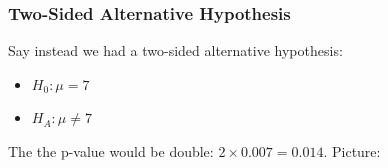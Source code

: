 \documentclass[handout]{beamer}
\newcommand{\blue}[1]{\textcolor{blue2}{#1}}
\newcommand{\xbar}{\overline{x}}
\begin{document}
%
%




%


\begin{frame}
\frametitle{Two-Sided Alternative Hypothesis}
Say instead we had a \blue{two-sided alternative hypothesis}:

\begin{itemize}
\item $H_0: \mu = 7$
\item $H_A: \mu \neq 7$
\end{itemize}

\pause The the p-value would be double: $2 \times 0.007= 0.014$.  Picture:

\vspace{4cm}

\end{frame}
\end{document}
